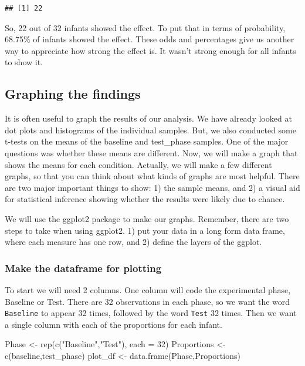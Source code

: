 \documentclass[
]{book}
\newenvironment{Shaded}{\begin{snugshade}}{\end{snugshade}}
\newcommand{\AttributeTok}[1]{\textcolor[rgb]{0.77,0.63,0.00}{#1}}
\newcommand{\DecValTok}[1]{\textcolor[rgb]{0.00,0.00,0.81}{#1}}
\newcommand{\FunctionTok}[1]{\textcolor[rgb]{0.00,0.00,0.00}{#1}}
\newcommand{\NormalTok}[1]{#1}
\newcommand{\OtherTok}[1]{\textcolor[rgb]{0.56,0.35,0.01}{#1}}
\newcommand{\StringTok}[1]{\textcolor[rgb]{0.31,0.60,0.02}{#1}}
\begin{document}
\begin{verbatim}
## [1] 22
\end{verbatim}

So, 22 out of 32 infants showed the effect. To put that in terms of probability, 68.75\% of infants showed the effect. These odds and percentages give us another way to appreciate how strong the effect is. It wasn't strong enough for all infants to show it.

\hypertarget{graphing-the-findings}{%
\subsection{Graphing the findings}\label{graphing-the-findings}}

It is often useful to graph the results of our analysis. We have already looked at dot plots and histograms of the individual samples. But, we also conducted some t-tests on the means of the baseline and test\_phase samples. One of the major questions was whether these means are different. Now, we will make a graph that shows the means for each condition. Actually, we will make a few different graphs, so that you can think about what kinds of graphs are most helpful. There are two major important things to show: 1) the sample means, and 2) a visual aid for statistical inference showing whether the results were likely due to chance.

We will use the ggplot2 package to make our graphs. Remember, there are two steps to take when using ggplot2. 1) put your data in a long form data frame, where each measure has one row, and 2) define the layers of the ggplot.

\hypertarget{make-the-dataframe-for-plotting}{%
\subsubsection{Make the dataframe for plotting}\label{make-the-dataframe-for-plotting}}

To start we will need 2 columns. One column will code the experimental phase, Baseline or Test. There are 32 observations in each phase, so we want the word \texttt{Baseline} to appear 32 times, followed by the word \texttt{Test} 32 times. Then we want a single column with each of the proportions for each infant.

\begin{Shaded}
\begin{Highlighting}[]
\NormalTok{Phase }\OtherTok{\textless{}{-}} \FunctionTok{rep}\NormalTok{(}\FunctionTok{c}\NormalTok{(}\StringTok{"Baseline"}\NormalTok{,}\StringTok{"Test"}\NormalTok{), }\AttributeTok{each =} \DecValTok{32}\NormalTok{)}
\NormalTok{Proportions }\OtherTok{\textless{}{-}} \FunctionTok{c}\NormalTok{(baseline,test\_phase)}
\NormalTok{plot\_df }\OtherTok{\textless{}{-}} \FunctionTok{data.frame}\NormalTok{(Phase,Proportions)}
\end{Highlighting}
\end{Shaded}
\end{document}
